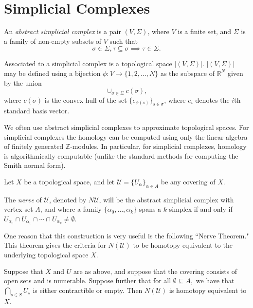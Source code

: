 \documentclass[11pt,reqno,oneside,a4paper]{article}
\begin{document}
\section{Simplicial Complexes}

\begin{defn}
	An \textit{abstract simplicial complex} is a pair $(V, \Sigma)$, where $V$ is a finite set, and $\Sigma$ is a family of non-empty subsets of $V$ such that 
	$$\sigma \in \Sigma, \tau \subseteq \sigma \implies \tau \in \Sigma.$$
	
	Associated to a simplicial complex is a topological space $|(V,\Sigma)|$. $|(V,\Sigma)|$ may be defined using a bijection $\phi : V \to \{1, 2, \dots,N\}$ as the subspace of $\mathbb{R}^N$ given by the union 
	$$\cup_{\sigma \in \Sigma} c(\sigma),$$
	where $c(\sigma)$ is the convex hull of the set $\{e_{\phi(s)}\}_{s\in \sigma}$, where $e_i$ denotes the $i$th standard basis vector.
\end{defn}

	 We often use abstract simplicial complexes to approximate topological spaces. For simplicial complexes the homology can be computed using only the linear algebra of finitely generated $\mathbb{Z}$-modules. In particular, for simplicial complexes, homology is algorithmically computable (unlike the standard methods for computing the Smith normal form).

\begin{defn}
	Let $X$ be a topological space, and let $\mathcal{U} = \{U_\alpha\}_{\alpha\in A}$ be any covering of $X$. 
	
	The \textit{nerve} of $\mathcal{U}$, denoted by $N\mathcal{U}$, will be the abstract simplicial complex with vertex set $A$, and where a family $\{\alpha_0, \dots, \alpha_k\}$ spans a $k$-simplex if and only if $U_{\alpha_0}\cap U_{\alpha_1} \cap \cdots \cap U_{\alpha_k} \neq \emptyset.$
\end{defn}

One reason that this construction is very useful is the following ``Nerve Theorem." This theorem gives the criteria for $N(\mathcal{U})$ to be homotopy equivalent to the underlying topological space $X$.

\begin{thm}
Suppose that $X$ and $U$ are as above, and suppose that the covering consists of open sets and is numerable. Suppose further that for all $\emptyset \subseteq A,$ we have that $\bigcap_{s\in S} U_s$ is either contractible or empty. Then $N(\mathcal{U})$ is homotopy equivalent to $X$.
\end{thm}
\end{document}
